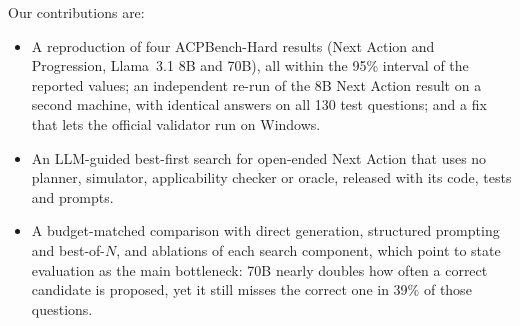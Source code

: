 Our contributions are:
\begin{itemize}
  \item A reproduction of four ACPBench-Hard results (Next Action and Progression, Llama~3.1 8B and
        70B), all within the 95\% interval of the reported values; an independent re-run of the 8B Next Action result on a second machine, with identical answers on all 130 test questions; and a fix that lets the
        official validator run on Windows.
  \item An LLM-guided best-first search for open-ended Next Action that uses no planner, simulator,
        applicability checker or oracle, released with its code, tests and prompts.
  \item A budget-matched comparison with direct generation, structured prompting and best-of-$N$,
        and ablations of each search component, which point to state evaluation as the main bottleneck: 70B nearly doubles how often a correct candidate is proposed, yet it still misses the correct one in 39\% of those questions.
\end{itemize}
